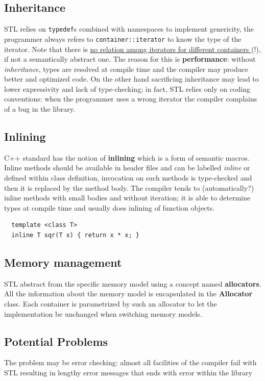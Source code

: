 \subsection{Inheritance}
STL relies on \lstinline|typedef|s combined with namespaces to
implement genericity, the programmer always refers to \lstinline|container::iterator| to know the type of the iterator.
Note that there is \ul{no relation among iterators for different containers }(!), if not a semantically abstract one.
The reason for this is \textbf{performance}: 
without \textit{inheritance}, types are resolved at compile time and the compiler may produce better and optimized code.
On the other hand sacrificing inheritance may lead to
lower expressivity and lack of type-checking;
in fact, STL relies only on coding conventions:
when the programmer uses a wrong iterator the compiler complains of a bug in the library.

\subsection{Inlining}
C++ standard has the notion of \textbf{inlining} which is a form of semantic macros.
Inline methods should be available in header files
and can be labelled \textit{inline} or defined within class
definition, invocation on such methods is type-checked and then it is
replaced by the method body.
The compiler tends to (automatically?)
inline methods with small bodies and without iteration; 
it is able to determine types at compile
time and usually does inlining of function objects.

\lstset{language=C++}
\begin{lstlisting}
  template <class T>
  inline T sqr(T x) { return x * x; }
\end{lstlisting}

\lstset{style=javaBlockAnn}

\subsection{Memory management}
STL abstract from the specific memory model using a concept named \textbf{allocators}.
All the information about the memory model is
encapsulated in the \textbf{Allocator} class.
Each container is parametrized by such an allocator to let
the implementation be unchanged when switching
memory models.

\subsection{Potential Problems}
The problem may be error checking: 
almost all facilities of the compiler fail with STL resulting in lengthy error messages that ends with error within the library